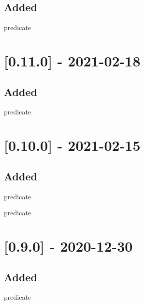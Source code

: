 \subsection{Added}

\begin{shortlist}
    \item {} predicate
\end{shortlist}

\section{[0.11.0] - 2021-02-18}

\subsection{Added}

\begin{shortlist}
    \item {} predicate
\end{shortlist}

\section{[0.10.0] - 2021-02-15}

\subsection{Added}

\begin{shortlist}
    \item {} predicate
    \item {} predicate
\end{shortlist}

\section{[0.9.0] - 2020-12-30}

\subsection{Added}

\begin{shortlist}
    \item {} predicate
\end{shortlist}

